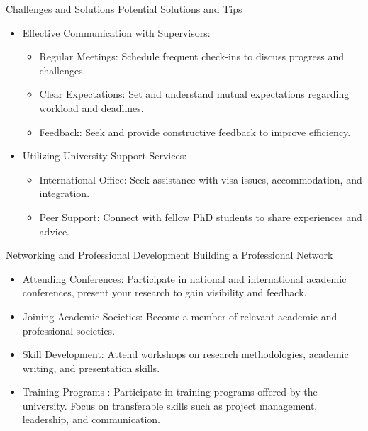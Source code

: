 \documentclass[10pt]{beamer}
\begin{document}
\begin{frame}[fragile]{Challenges and Solutions}
\alert{Potential Solutions and Tips}
	\begin{itemize}
		\item Effective Communication with Supervisors:
		\begin{itemize}
			\item Regular Meetings: Schedule frequent check-ins to discuss progress and challenges.
			\item Clear Expectations: Set and understand mutual expectations regarding workload and deadlines.
			\item Feedback: Seek and provide constructive feedback to improve efficiency.
		\end{itemize}	
		\item Utilizing University Support Services:
		\begin{itemize}
			\item International Office: Seek assistance with visa issues, accommodation, and integration.
			\item Peer Support: Connect with fellow PhD students to share experiences and advice.
		\end{itemize}			 	
	\end{itemize}
\end{frame}

\begin{frame}[fragile]{Networking and Professional Development}
\alert{Building a Professional Network}
	\begin{itemize}
		\item Attending Conferences: Participate in national and international academic conferences, present your research to gain visibility and feedback.
		\item Joining Academic Societies: Become a member of relevant academic and professional societies.
		\item Skill Development: Attend workshops on research methodologies, academic writing, and presentation skills.
		\item Training Programs : Participate in training programs offered by the university. Focus on transferable skills such as project management, leadership, and communication.
	
	\end{itemize}
\end{frame}
\end{document}
